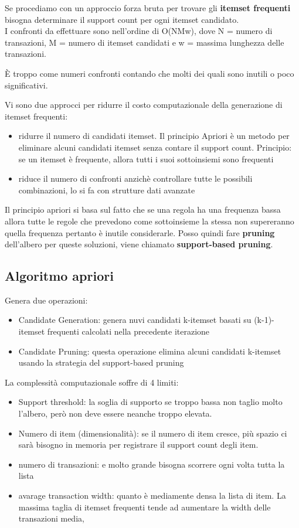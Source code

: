 Se procediamo con un approccio forza bruta per trovare gli \textbf{itemset frequenti} bisogna determinare il support count per ogni itemset candidato. \\
I confronti da effettuare sono nell'ordine di O(NMw), dove N = numero di transazioni, M = numero di itemset candidati e w = massima lunghezza delle transazioni. 

\`E troppo come numeri confronti contando che molti dei quali sono inutili o poco significativi.

Vi sono due approcci per ridurre il costo computazionale della generazione di itemset frequenti:
\begin{itemize}
	\item ridurre il numero di candidati itemset. Il principio Apriori \`e un metodo per eliminare alcuni candidati itemset senza contare il support count. Principio: se un itemset \`e frequente, allora tutti i suoi sottoinsiemi sono frequenti
	\item riduce il numero di confronti anzich\`e controllare tutte le possibili combinazioni, lo si fa con strutture dati avanzate
\end{itemize}

Il principio apriori si basa sul fatto che se una regola ha una frequenza bassa allora tutte le regole che prevedono come sottoinsieme la stessa non supereranno quella frequenza pertanto \`e inutile considerarle. Posso quindi fare \textbf{pruning} dell'albero per queste soluzioni, viene chiamato \textbf{support-based pruning}.

\subsection{Algoritmo apriori}
Genera due operazioni:
\begin{itemize}
	\item Candidate Generation: genera nuvi candidati k-itemset basati su (k-1)-itemset frequenti calcolati nella precedente iterazione
	\item Candidate Pruning: questa operazione elimina alcuni candidati k-itemset usando la strategia del support-based pruning
\end{itemize}

La complessit\`a computazionale soffre di 4 limiti:
\begin{itemize}
	\item Support threshold: la soglia di supporto se troppo bassa non taglio molto l'albero, per\`o non deve essere neanche troppo elevata. 
	\item Numero di item (dimensionalit\`a): se il numero di item cresce, pi\`u spazio ci sar\`a bisogno in memoria per registrare il support count degli item.
	\item numero di transazioni: e molto grande bisogna scorrere ogni volta tutta la lista
	\item avarage transaction width: quanto \`e mediamente densa la lista di item. La massima taglia di itemset frequenti tende ad aumentare la width delle transazioni media,
\end{itemize}

